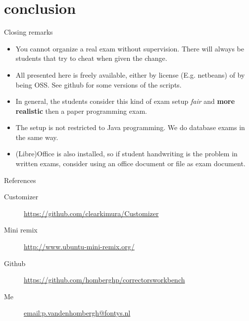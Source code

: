 \section{conclusion}
\begin{frame}{Closing remarks}
  \begin{itemize}
  \item You cannot organize a real exam without supervision. There
    will always be students that try to cheat when given the change.
  \item All presented here is freely available, either by license
    (E.g. netbeans) of by being OSS. See github for some versions of
    the scripts.
  \item In general, the students consider this kind of exam setup \textit{fair}
    and \textbf{more realistic} then a paper programming exam.
  \item The setup is not restricted to Java programming. We do
    database exams in the same way.
  \item (Libre)Office is also installed, so if student handwriting is
    the problem in written exams, consider using an office document or
     file as exam document.
  \end{itemize}
\end{frame}
\begin{frame}{References}

  \begin{description}
  \item[Customizer] \url{https://github.com/clearkimura/Customizer}
    \item[Mini remix] \url{http://www.ubuntu-mini-remix.org/}
    \item[Github]
      \url{https://github.com/homberghp/correctorsworkbench}
    \item[Me] \url{email:p.vandenhombergh@fontys.nl}
  \end{description}
\end{frame}
